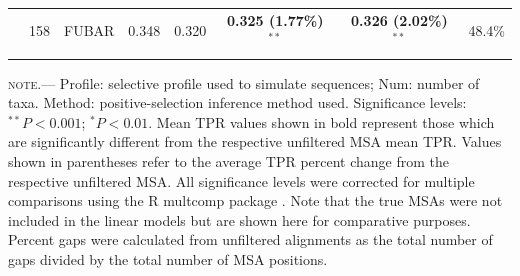 \documentclass[11pt]{article}
\begin{document}
\begin{table}[htbp]
\begin{adjustwidth}{-1.85cm}{}
\begin{tabular}{l l l c c c c c}
 & 158 & FUBAR & 0.348 & 0.320 & \textbf{0.325 (1.77\%)$^{\ast\ast}$} & \textbf{0.326 (2.02\%)$^{\ast\ast}$} & 48.4\% \\
\noalign{\smallskip}\hline\noalign{\smallskip}
\end{tabular}
\newline
\textsc{note.}--- Profile: selective profile used to simulate sequences; Num: number of taxa. Method: positive-selection inference method used. Significance levels:  $^{\ast\ast} P < 0.001$; $^{\ast} P < 0.01$. Mean TPR values shown in bold represent those which are significantly different from the respective unfiltered MSA mean TPR. Values shown in parentheses refer to the average TPR percent change from the respective unfiltered MSA. All significance levels were corrected for multiple comparisons using the R multcomp package \citep{Hothorn2008}. Note that the true MSAs were not included in the linear models but are shown here for comparative purposes. Percent gaps were calculated from unfiltered alignments as the total number of gaps divided by the total number of MSA positions.
\end{adjustwidth}
\end{table}
\end{document}
